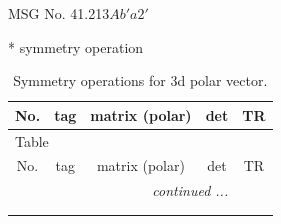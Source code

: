 \documentclass[fleqn,8pt]{jsarticle}
\begin{document}
\setcounter{MaxMatrixCols}{32}

\renewcommand{\tablename}{Table~}
\renewcommand{\figurename}{Figure~}
\begin{center}
\LARGE
MSG No. 41.213\quad$Ab'a2'$
\end{center}
* symmetry operation
\renewcommand{\arraystretch}{1.3}
\begin{longtable}{ccccc}
\caption{Symmetry operations for 3d polar vector.}
 \\
 \hline \hline
No. & tag & matrix (polar) & det & TR \\ \hline \endfirsthead

\multicolumn{4}{l}{\tablename\ \thetable{}} \\
 \hline \hline
No. & tag & matrix (polar) & det & TR \\ \hline \endhead

 \hline \hline
\multicolumn{4}{r}{\footnotesize\it continued ...} \\ \endfoot

 \hline \hline
\multicolumn{4}{r}{} \\ \endlastfoot


\end{longtable}
\end{document}
